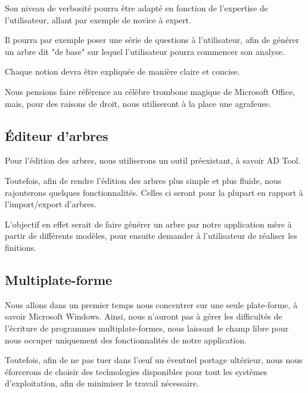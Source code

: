         Son niveau de verbosité pourra être adapté en fonction de l'expertise de l'utilisateur, allant par exemple de novice à expert. %
        
        Il pourra par exemple poser une série de questions à l'utilisateur, afin de générer un arbre dit "de base" sur lequel l'utilisateur pourra commencer son analyse.
        
        Chaque notion devra être expliquée de manière claire et concise.

        Nous pensions faire référence au célèbre trombone magique de Microsoft Office, mais, pour des raisons de droit, nous utiliseront à la place une agrafeuse.
        
    \subsection{\'Editeur d'arbres}
        \label{subsec:edit_arbre}
        Pour l'édition des arbres, nous utiliserons un outil préexistant, à savoir AD Tool\cite{adtool_paper}.
        
        Toutefois, afin de rendre l'édition des arbres plus simple et plus fluide, nous rajouterons quelques fonctionnalités. Celles ci seront pour la plupart en rapport à l'import/export d'arbres.

        L'objectif en effet serait de faire générer un arbre par notre application mère à partir de différents modèles, pour ensuite demander à l'utilisateur de réaliser les finitions.
    
    \subsection{Multiplate-forme}
        Nous allons dans un premier temps nous concentrer sur une seule plate-forme, à savoir Microsoft Windows. Ainsi, nous n'auront pas à gérer les difficultés de l'écriture de programmes multiplate-formes, nous laissant le champ libre pour nous occuper uniquement des fonctionnalités de notre application.

        Toutefois, afin de ne pas tuer dans l’œuf un éventuel portage ultérieur, nous nous éforcerons de choisir des technologies disponibles pour tout les systèmes d'exploitation, afin de minimiser le travail nécessaire.